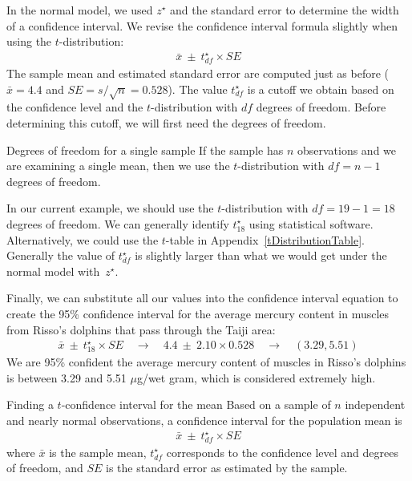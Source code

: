 In the normal model, we used $z^{\star}$ and the standard error to determine the width of a confidence interval. We revise the confidence interval formula slightly when using the $t$-distribution:
\begin{align*}
\bar{x} \ \pm\  t^{\star}_{df} \times SE
\end{align*}
The sample mean and estimated standard error are computed just as before ($\bar{x} = 4.4$ and $SE = s/\sqrt{n} = 0.528$). The value $t^{\star}_{df}$ is a cutoff we obtain based on the confidence level and the $t$-distribution with $df$ degrees of freedom. Before determining this cutoff, we will first need the degrees of freedom.

\begin{onebox}{Degrees of freedom for a single sample}
If the sample has $n$ observations and we are examining a single mean, then we use the $t$-distribution with $df=n-1$ degrees of freedom.
\end{onebox}

In our current example, we should use the $t$-distribution
with $df=19-1=18$ degrees of freedom.
We can generally identify $t_{18}^{\star}$
using statistical software.
Alternatively, we could use the $t$-table in
Appendix~\ref{tDistributionTable}.
Generally the value of $t^{\star}_{df}$ is slightly larger
than what we would get under the normal model with~$z^{\star}$.

Finally, we can substitute all our values into the confidence interval equation to create the 95\% confidence interval for the average mercury content in muscles from Risso's dolphins that pass through the Taiji area:
\begin{align*}
\bar{x} \ \pm\  t^{\star}_{18} \times SE
  \quad \to \quad 4.4 \ \pm\  2.10 \times 0.528
  \quad \to \quad (3.29, 5.51)
\end{align*}
We are 95\% confident the average mercury content of muscles in Risso's dolphins is between 3.29 and 5.51 $\mu$g/wet gram, which is considered extremely high.


\begin{onebox}{Finding a $t$-confidence interval
    for the mean}
  Based on a sample of $n$ independent and nearly normal
  observations, a confidence interval for the population
  mean is
  \begin{align*}
  \bar{x} \ \pm\  t^{\star}_{df} \times SE
  \end{align*}
  where $\bar{x}$ is the sample mean, $t^{\star}_{df}$
  corresponds to the confidence level and degrees of freedom,
  and $SE$ is the standard error as estimated by the sample.
\end{onebox}


